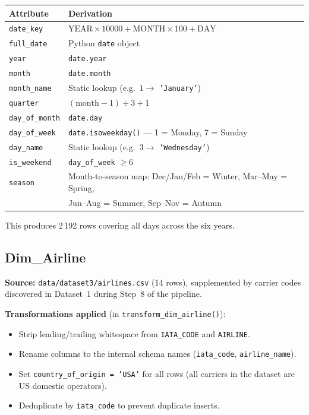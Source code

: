 \documentclass[12pt,a4paper]{article}
\begin{document}
\begin{center}
\begin{tabular}{ll}
\toprule
\textbf{Attribute} & \textbf{Derivation} \\
\midrule
\texttt{date\_key}    & $\text{YEAR} \times 10000 + \text{MONTH} \times 100 + \text{DAY}$ \\
\texttt{full\_date}   & Python \texttt{date} object \\
\texttt{year}         & \texttt{date.year} \\
\texttt{month}        & \texttt{date.month} \\
\texttt{month\_name}  & Static lookup (e.g.\ $1 \to$ \texttt{'January'}) \\
\texttt{quarter}      & $(\text{month} - 1) \div 3 + 1$ \\
\texttt{day\_of\_month} & \texttt{date.day} \\
\texttt{day\_of\_week}  & \texttt{date.isoweekday()} — 1 = Monday, 7 = Sunday \\
\texttt{day\_name}    & Static lookup (e.g.\ $3 \to$ \texttt{'Wednesday'}) \\
\texttt{is\_weekend}  & \texttt{day\_of\_week} $\geq 6$ \\
\texttt{season}       & Month-to-season map: Dec/Jan/Feb = Winter, Mar–May = Spring,\\
                      & Jun–Aug = Summer, Sep–Nov = Autumn \\
\bottomrule
\end{tabular}
\end{center}

This produces 2\,192 rows covering all days across the six years.

\subsection{Dim\_Airline}

\textbf{Source:} \texttt{data/dataset3/airlines.csv} (14 rows), supplemented
by carrier codes discovered in Dataset~1 during Step~8 of the pipeline.

\textbf{Transformations applied} (in \texttt{transform\_dim\_airline()}):

\begin{itemize}
    \item Strip leading/trailing whitespace from \texttt{IATA\_CODE} and
          \texttt{AIRLINE}.
    \item Rename columns to the internal schema names
          (\texttt{iata\_code}, \texttt{airline\_name}).
    \item Set \texttt{country\_of\_origin = 'USA'} for all rows (all carriers
          in the dataset are US domestic operators).
    \item Deduplicate by \texttt{iata\_code} to prevent duplicate inserts.
\end{itemize}
\end{document}
